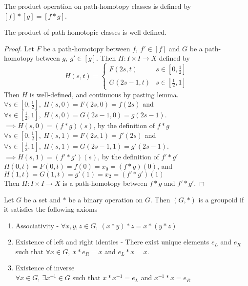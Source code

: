 \begin{definition}
	The product operation on path-homotopy classes is defined by $[f]\ast[g] = [f\ast{}g]$.
\end{definition}
\begin{remark} The product of path-homotopic classes is well-defined.\end{remark}
\begin{proof}
	Let $F$ be a path-homotopy between $f,\ f' \in [f]$ and $G$ be a path-homotopy between $g,\ g' \in [g]$.
	Then $H : I \times I \to X$ defined by
	\[ H(s,t) = \begin{cases} F(2s,t) & s \in [0,\frac{1}{2}] \\ G(2s-1,t) & s \in [\frac{1}{2},1] \end{cases} \]
	Then $H$ is well-defined, and continuous by pasting lemma.\\
	
\noindent $\forall s \in [0,\frac{1}{2}],\ H(s,0) = F(2s,0) = f(2s)$ and\\
	$\forall s \in [\frac{1}{2},1],\ H(s,0) = G(2s-1,0) = g(2s-1)$.\\
	$\implies H(s,0) = (f\ast{}g)(s)$, by the definition of $f\ast{}g$\\

\noindent $\forall s \in [0,\frac{1}{2}],\ H(s,1) = F(2s,1) = f'(2s)$ and\\
	$\forall s \in [\frac{1}{2},1],\ H(s,1) = G(2s-1,1) = g'(2s-1)$.\\
	$\implies H(s,1) = (f'\ast{}g')(s)$, by the definition of $f'\ast{}g'$\\

\noindent $H(0,t) = F(0,t) = f(0) = x_0 = (f\ast{}g)(0)$, and\\
	$H(1,t) = G(1,t) = g'(1) = x_2 =  (f'\ast{}g')(1)$\\

	Then $H : I \times I \to X$ is a path-homotopy between $f\ast{}g$ and $f'\ast{}g'$.
\end{proof}

\begin{definition}[Groupoid]
\begin{commentary}
	Let $G$ be a set and $\ast$ be a binary operation on $G$.
	Then $(G,\ast)$ is a groupoid if it satisfies the following axioms
	\begin{enumerate}[label=g\arabic*]
		\item Associativity - $\forall x,y,z \in G,\ (x\ast{}y)\ast{}z = x \ast{}(y\ast{}z)$
		\item Existence of left and right identies - There exist unique elements $e_L$ and $e_R$ such that $\forall x \in G,\ x\ast{}e_R = x$ and $e_L\ast{}x = x$.
		\item Existence of inverse\\
			$\forall x \in G,\ \exists x^{-1} \in G$ such that $x \ast{} x^{-1} = e_L$ and $x^{-1} \ast{} x = e_R$
	\end{enumerate}
\end{commentary}
\end{definition}

